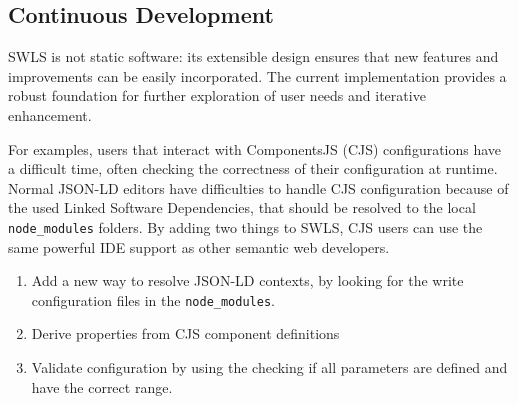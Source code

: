 %
%
%
%

\subsection{Continuous Development}

SWLS is not static software: its extensible design ensures that new features and improvements can be easily incorporated. 
The current implementation provides a robust foundation for further exploration of user needs and iterative enhancement.

For examples,
users that interact with ComponentsJS (CJS) configurations have a difficult time\cite{CJS}, often checking the correctness of their configuration at runtime.
Normal JSON-LD editors have difficulties to handle CJS configuration because of the used Linked Software Dependencies\cite{CJS2}, that should be resolved to the local \texttt{node\_modules} folders.
By adding two things to SWLS, CJS users can use the same powerful IDE support as other semantic web developers.
\begin{enumerate}
  \item Add a new way to resolve JSON-LD contexts, by looking for the write configuration files in the \texttt{node\_modules}.
  \item Derive properties from CJS component definitions
  \item Validate configuration by using the checking if all parameters are defined and have the correct range.

\end{enumerate}


